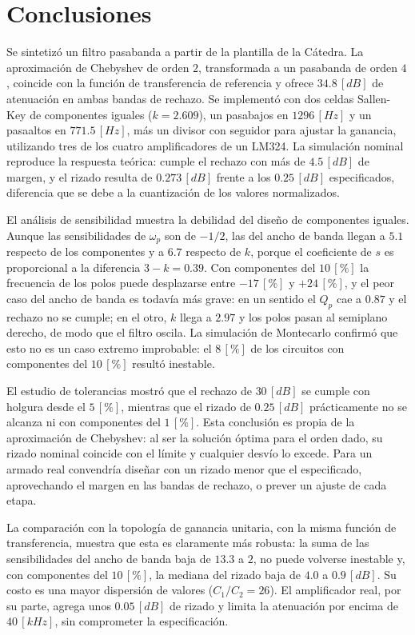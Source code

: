\section{Conclusiones}
\label{sec_6}
Se sintetizó un filtro pasabanda a partir de la plantilla de la Cátedra. La aproximación de Chebyshev de orden $2$, transformada a un pasabanda de orden $4$, coincide con la función de transferencia de referencia y ofrece $34.8 \, [dB]$ de atenuación en ambas bandas de rechazo. Se implementó con dos celdas Sallen-Key de componentes iguales ($k = 2.609$), un pasabajos en $1296 \, [Hz]$ y un pasaaltos en $771.5 \, [Hz]$, más un divisor con seguidor para ajustar la ganancia, utilizando tres de los cuatro amplificadores de un LM324. La simulación nominal reproduce la respuesta teórica: cumple el rechazo con más de $4.5 \, [dB]$ de margen, y el rizado resulta de $0.273 \, [dB]$ frente a los $0.25 \, [dB]$ especificados, diferencia que se debe a la cuantización de los valores normalizados.

El análisis de sensibilidad muestra la debilidad del diseño de componentes iguales. Aunque las sensibilidades de $\omega_p$ son de $-1/2$, las del ancho de banda llegan a $5.1$ respecto de los componentes y a $6.7$ respecto de $k$, porque el coeficiente de $s$ es proporcional a la diferencia $3 - k = 0.39$. Con componentes del $10 \, [\%]$ la frecuencia de los polos puede desplazarse entre $-17 \, [\%]$ y $+24 \, [\%]$, y el peor caso del ancho de banda es todavía más grave: en un sentido el $Q_p$ cae a $0.87$ y el rechazo no se cumple; en el otro, $k$ llega a $2.97$ y los polos pasan al semiplano derecho, de modo que el filtro oscila. La simulación de Montecarlo confirmó que esto no es un caso extremo improbable: el $8 \, [\%]$ de los circuitos con componentes del $10 \, [\%]$ resultó inestable.

El estudio de tolerancias mostró que el rechazo de $30 \, [dB]$ se cumple con holgura desde el $5 \, [\%]$, mientras que el rizado de $0.25 \, [dB]$ prácticamente no se alcanza ni con componentes del $1 \, [\%]$. Esta conclusión es propia de la aproximación de Chebyshev: al ser la solución óptima para el orden dado, su rizado nominal coincide con el límite y cualquier desvío lo excede. Para un armado real convendría diseñar con un rizado menor que el especificado, aprovechando el margen en las bandas de rechazo, o prever un ajuste de cada etapa.

La comparación con la topología de ganancia unitaria, con la misma función de transferencia, muestra que esta es claramente más robusta: la suma de las sensibilidades del ancho de banda baja de $13.3$ a $2$, no puede volverse inestable y, con componentes del $10 \, [\%]$, la mediana del rizado baja de $4.0$ a $0.9 \, [dB]$. Su costo es una mayor dispersión de valores ($C_1/C_2 = 26$). El amplificador real, por su parte, agrega unos $0.05 \, [dB]$ de rizado y limita la atenuación por encima de $40 \, [kHz]$, sin comprometer la especificación.

